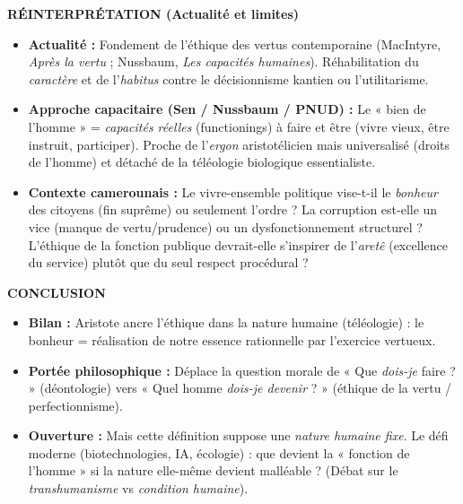 \documentclass[11pt]{article}
\newcommand{\cle}[1]{{\popxbold\color{popdark}#1}}
\begin{document}
\begin{exoresolu}
\textbf{RÉINTERPRÉTATION (Actualité et limites)}
\begin{itemize}
    \item \textbf{Actualité :} Fondement de l'\cle{éthique des vertus} contemporaine (MacIntyre, \emph{Après la vertu} ; Nussbaum, \emph{Les capacités humaines}). Réhabilitation du \emph{caractère} et de l'\emph{habitus} contre le décisionnisme kantien ou l'utilitarisme.
    \item \textbf{Approche capacitaire (Sen / Nussbaum / PNUD) :} Le « bien de l'homme » = \emph{capacités réelles} (functionings) à faire et être (vivre vieux, être instruit, participer). Proche de l'\emph{ergon} aristotélicien mais universalisé (droits de l'homme) et détaché de la téléologie biologique essentialiste.
    \item \textbf{Contexte camerounais :} Le \guillemotleft vivre-ensemble \guillemotright politique vise-t-il le \emph{bonheur} des citoyens (fin suprême) ou seulement l'ordre ? La corruption est-elle un vice (manque de vertu/prudence) ou un dysfonctionnement structurel ? L'éthique de la fonction publique devrait-elle s'inspirer de l'\emph{aretê} (excellence du service) plutôt que du seul respect procédural ?
\end{itemize}

\textbf{CONCLUSION}
\begin{itemize}
    \item \textbf{Bilan :} Aristote ancre l'éthique dans la nature humaine (téléologie) : le bonheur = réalisation de notre essence rationnelle par l'exercice vertueux.
    \item \textbf{Portée philosophique :} Déplace la question morale de « Que \emph{dois-je} faire ? » (déontologie) vers « Quel homme \emph{dois-je devenir} ? » (éthique de la vertu / perfectionnisme).
    \item \textbf{Ouverture :} Mais cette définition suppose une \emph{nature humaine fixe}. Le défi moderne (biotechnologies, IA, écologie) : que devient la « fonction de l'homme » si la nature elle-même devient malléable ? (Débat sur le \emph{transhumanisme} vs \emph{condition humaine}).
\end{itemize}
\end{exoresolu}
\end{document}
